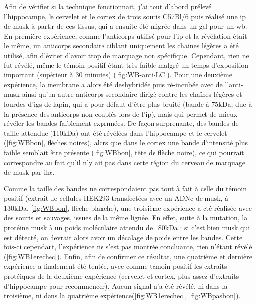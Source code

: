 	Afin de vérifier si la technique fonctionnait, j'ai tout d'abord prélevé l'hippocampe, le cervelet et le cortex de trois souris C57Bl/6 puis réalisé une \gls{ip} de \gls{musk} à partir de ces tissus, qui a ensuite été migrée dans un gel pour un \gls{wb}. En première expérience, comme l'anticorps utilisé pour l'\gls{ip} et la révélation était le même, un anticorps secondaire ciblant uniquement les chaines légères a été utilisé, afin d'éviter d'avoir trop de marquage non spécifique. Cependant, rien ne fut révélé, même le témoin positif étant très faible malgré un temps d'exposition important (supérieur à 30 minutes) (\cref{fig:WB-anti-LC}). Pour une deuxième expérience, la membrane a alors été deshybridée puis ré-incubée avec de l'anti-\gls{musk} ainsi qu'un autre anticorps secondaire dirigé contre les chaînes légères et lourdes d'\Glspl{ig} de lapin, qui a pour défaut d'être plus bruité (bande à 75kDa, due à la présence des anticorps non couplés lors de l'\gls{ip}), mais qui permet de mieux révéler les bandes faiblement exprimées. De façon surprenante, des bandes de taille attendue (110kDa) ont été révélées dans l'hippocampe et le cervelet (\cref{fig:WBbon}, flèches noires), alors que dans le cortex une bande d'intensité plus faible semblait être présente (\cref{fig:WBbon}, tête de flèche noire), ce qui pourrait correspondre au fait qu'il n'y ait pas dans cette région du cerveau de marquage de \gls{musk} par \gls{ihc}. 
	
	Comme la taille des bandes ne correspondaient pas tout à fait à celle du témoin positif (extrait de cellules HEK293 transfectées avec un ADNc de \gls{musk}, à 130kDa, \cref{fig:WBbon}, flèche blanche), une troisième expérience a été réalisée avec des souris \mcrd et sauvages, issues de la même lignée. En effet, suite à la mutation, la protéine \gls{musk} à un poids moléculaire attendu de ~80kDa : si c'est bien \gls{musk} qui est détecté, on devrait alors avoir un décalage de poids entre les bandes. Cette fois-ci cependant, l'expérience ne s'est pas montrée concluante, rien n'étant révélé (\cref{fig:WB1erechec}). Enfin, afin de confirmer ce résultat, une quatrième et dernière expérience a finalement été tentée, avec comme témoin positif les extraits protéiques de la deuxième expérience (cervelet et cortex, plus assez d'extraits d'hippocampe pour recommencer). Aucun signal n'a été révélé, ni dans la troisième, ni dans la quatrième expérience(\cref{fig:WB1erechec}, \cref{fig:WBpasbon}).
	
